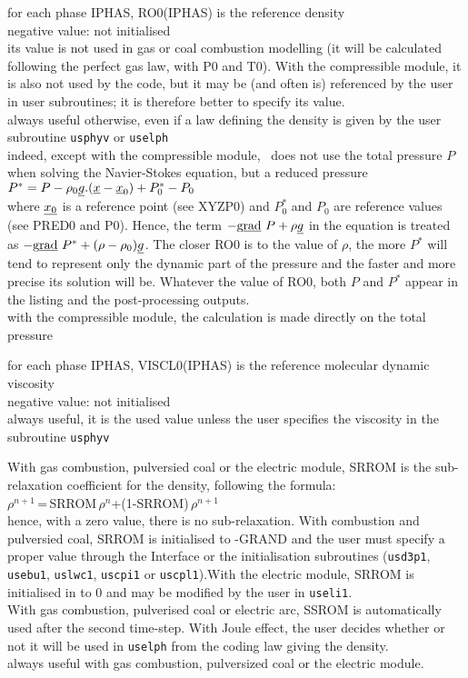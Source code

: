 {for each phase IPHAS, RO0(IPHAS) is the reference density\\
negative value: not initialised\\
its value is not used in gas or coal combustion modelling (it
will be calculated following the perfect gas law, with P0 and T0). With the
compressible module, it is also not used by the code, but it may be (and often
is) referenced by the user in user subroutines; it is therefore better to
specify its value.\\
always useful otherwise, even if a law defining the density is given by
the user subroutine \texttt{usphyv} or \texttt{uselph}\\
indeed, except with the
compressible module, \CS\ does not
use the total pressure $P$ when solving the Navier-Stokes equation, but a
reduced pressure \\
$P^*=P-\rho_0\underline{g}.(\underline{x}-\underline{x}_0)+P^*_0-P_0$\\
where
$\underline{x_0}$ is a reference point (see XYZP0) and $P^*_0$ and $P_0$ are
reference values (see PRED0 and P0). Hence, the term
$-\text{g}\underline{\text{rad}}\ {P}+\rho\underline{g}$ in the equation is treated as 
$-\text{g}\underline{\text{rad}}\ {P^*}+(\rho-\rho_0)\underline{g}$. The closer RO0 is to the value of $\rho$,
the more $P^*$ will tend to represent only the dynamic part of the pressure and
the faster and more precise its solution will be. Whatever the value of RO0,
both $P$ and $P^*$ appear in the listing and the post-processing outputs.\\
with the compressible module, the calculation is made directly on the total
pressure}

{for each phase IPHAS,  VISCL0(IPHAS) is the reference molecular dynamic
viscosity\\ 
negative value: not initialised\\
always useful, it is the used value unless the user specifies the
viscosity in the subroutine \texttt{usphyv}}

{With gas combustion, pulversied coal or the electric module, SRROM
 is the sub-relaxation coefficient for the density, following the formula:\\
$\rho^{n+1}$\,=\,SRROM\,$\rho^n$+(1-SRROM)\,$\rho^{n+1}$\\
hence, with a zero value, there is no sub-relaxation.
With combustion and pulversied coal, SRROM is initialised to -GRAND 
and the user must specify a proper value through the Interface or the
initialisation subroutines (\texttt{usd3p1},
 \texttt{usebu1}, \texttt{uslwc1}, \texttt{uscpi1} or
\texttt{uscpl1}).With the electric module, SRROM is initialised in to 0 
and may be modified by the user in \texttt{useli1}.\\
With gas combustion, pulverised coal or electric arc, SSROM is
automatically used after the second time-step. With Joule effect,
the user decides whether or not it will be used in \texttt{uselph}  
from the coding law giving the density.}\\
always useful with gas combustion, pulversized coal or the electric module.

